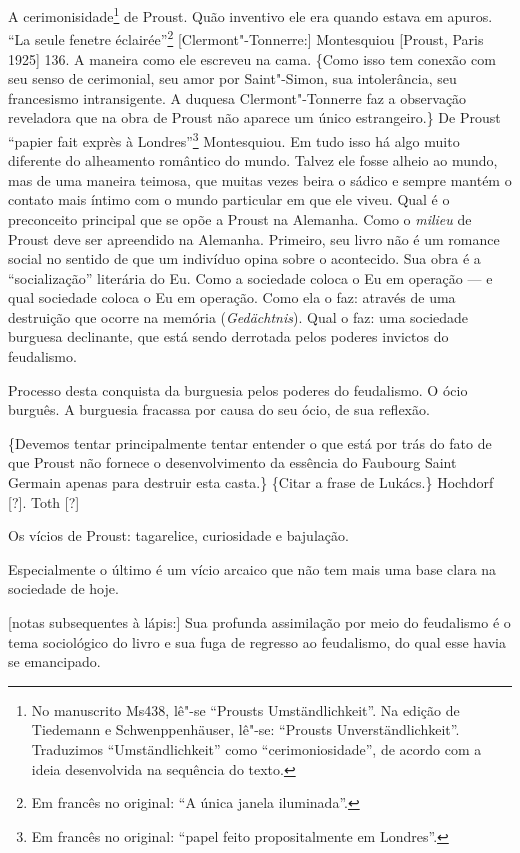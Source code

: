 A cerimonisidade\footnote{No manuscrito Ms438, lê"-se ``Prousts
  Umständlichkeit''. Na edição de Tiedemann e Schwenppenhäuser, lê"-se:
  ``Prousts Unverständlichkeit''. Traduzimos ``Umständlichkeit'' como
  ``cerimoniosidade'', de acordo com a ideia desenvolvida na sequência
  do texto. \versal{[N. T.]}} de Proust. Quão inventivo ele era quando estava em apuros.
``La seule fenetre éclairée''\footnote{Em francês no original: ``A
  única janela iluminada''. \versal{[N. T.]}} {[}Clermont"-Tonnerre:{]} Montesquiou
{[}Proust, Paris 1925{]} 136. A maneira como ele escreveu na cama.
\{Como isso tem conexão com seu senso de cerimonial, seu amor por
Saint"-Simon, sua intolerância, seu francesismo intransigente. A duquesa
Clermont"-Tonnerre faz a observação reveladora que na obra de Proust não
aparece um único estrangeiro.\} De Proust ``papier fait exprès à
Londres''\footnote{Em francês no original: ``papel feito %
  propositalmente em Londres''. \versal{[N. T.]}} Montesquiou. Em tudo isso há algo muito
diferente do alheamento romântico do mundo. Talvez ele fosse alheio ao
mundo, mas de uma maneira teimosa, que muitas vezes beira o sádico e
sempre mantém o contato mais íntimo com o mundo particular em que ele
viveu. Qual é o preconceito principal que se opõe a Proust na Alemanha.
Como o \emph{milieu} de Proust deve ser apreendido na Alemanha.
Primeiro, seu livro não é um romance social no sentido de que um
indivíduo opina sobre o acontecido. Sua obra é a ``socialização''
literária do Eu. Como a sociedade coloca o Eu em operação --- e qual
sociedade coloca o Eu em operação. Como ela o faz: através de uma
destruição que ocorre na memória (\emph{Gedächtnis}). Qual o faz: uma
sociedade burguesa declinante, que está sendo derrotada pelos poderes
invictos do feudalismo.

Processo desta conquista da burguesia pelos poderes do feudalismo. O
ócio burguês. A burguesia fracassa por causa do seu ócio, de sua
reflexão.

\{Devemos tentar principalmente tentar entender o que está por trás do
fato de que Proust não fornece o desenvolvimento da essência do Faubourg
Saint Germain apenas para destruir esta casta.\} \{Citar a frase de
Lukács.\} Hochdorf {[}?{]}. Toth {[}?{]}

Os vícios de Proust: tagarelice, curiosidade e bajulação.

Especialmente o último é um vício arcaico que não tem mais uma base
clara na sociedade de hoje.

{[}notas subsequentes à lápis:{]} Sua profunda assimilação por meio do
feudalismo é o tema sociológico do livro e sua fuga de regresso ao
feudalismo, do qual esse havia se emancipado.

